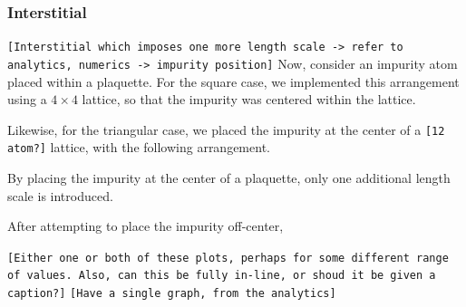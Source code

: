 \documentclass[aps,pra,superscriptaddress,twocolumn]{revtex4-1}
\newcommand{\commentSB}[1]{\texttt{\color{blue}[#1]}}
\newcommand{\commentSO}[1]{\texttt{\color{orange}[#1]}}
\newcommand{\commentTP}[1]{\texttt{\color{green}[#1]}}
\begin{document}
\subsubsection{Interstitial}
\commentSO{Interstitial which imposes one more length scale -> refer to analytics, numerics -> impurity position}
Now, consider an impurity atom placed within a plaquette. For the square case, we implemented this arrangement using a $4\times 4$ lattice, so that the impurity was centered within the lattice. 


Likewise, for the triangular case, we placed the impurity at the center of a \commentSB{12 atom?} lattice, with the following arrangement. 


By placing the impurity at the center of a plaquette, only one additional length scale is introduced. 



After attempting to place the impurity off-center, 




\commentSB{Either one or both of these plots, perhaps for some different range of values. Also, can this be fully in-line, or shoud it be given a caption?}
\commentTP{Have a single graph, from the analytics}
\end{document}
